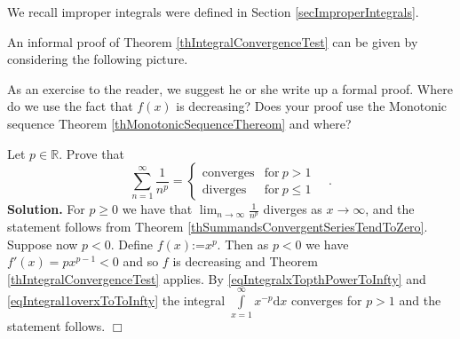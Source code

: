 \documentclass[12pt]{book}
\newcommand{\diff}{\text{d}}
\newcommand{\eqdef}{\textbf{:=}}
\newenvironment{solution}{\textbf{Solution.} }{$\Box$}
\newcommand{\optionalDisplay}[1]{}
\newcommand{\doublebrace}[4]{\left\{\begin{array}{ll} #1 & #2 \\#3 & #4  \end{array} \right.}
\begin{document}
We recall improper integrals were defined in Section \ref{secImproperIntegrals}.

An informal proof of Theorem \ref{thIntegralConvergenceTest} can be given by considering the following picture. 
\optionalDisplay{
\psset{xunit=0.6cm,yunit=0.6cm}

\begin{pspicture}(-1,-1)(9.5,6)

\rput(5.5,4){$\underbrace{ \int\limits_{1}^\infty f(x) \diff x}_{\mathrm{region~under~curve}} \geq\underbrace{ \sum\limits_{n=2}^{\infty} f(n)}_{\mathrm{blue~region}}$} 

\psaxes[labels=x, ticks=x]{<->}(0,0)(-1,-1)(9,6)

\pscustom[fillstyle=solid, linestyle=none,fillcolor=gray!30]{
\psplot{1}{9}{ 5 x  div}
\psline[linestyle=none](9, 0)(1,0)
}
\psplot[linewidth=1pt]{1}{9}{ 5 x  div}

\multido{\ra=1.0+1.0}{8}{%
\psframe[fillstyle=solid, fillcolor=cyan!40](\ra,0)(! \ra\space 1 add \space 5 \ra\space 1 add div )
}
\end{pspicture}
\begin{pspicture}(-1,-1)(9,6)
\psaxes[labels=x, ticks=x]{<->}(0,0)(-1,-1)(9,6)
\rput(5.5,4){$\underbrace{ \int\limits_{1}^\infty f(x) \diff x}_{\mathrm{region~under~curve}}\leq\underbrace{ \sum\limits_{n=1}^{\infty} f(n)}_{\mathrm{blue~region}}$} 

\multido{\ra=1.0+1.0}{8}{%
\psframe[fillstyle=solid, fillcolor=cyan!40](\ra,0)(! \ra\space 1 add \space 5 \ra\space div )
}
\psplot[linewidth=1pt]{1}{9}{ 5 x  div}
\end{pspicture}
} %

As an exercise to the reader, we suggest he or she write up a formal proof. Where do we use the fact that $f(x)$ is decreasing? Does your proof use the Monotonic sequence Theorem \ref{thMonotonicSequenceThereom} and where?

Let $p\in \mathbb R$. Prove that 
\begin{equation}\label{eqSumnToThePthConverges}
\sum\limits_{n=1}^{\infty} \frac{1}{n^p}= \doublebrace{\mathrm{converges}}{\mathrm{for~}p>1}{\mathrm{diverges}}{\mathrm{for~}p\leq 1}\quad .
\end{equation}
\begin{solution}
For $p\geq 0$ we have that $\lim_{n\to \infty} \frac{1}{n^p}$ diverges as $x\to \infty$, and the statement follows from Theorem \ref{thSummandsConvergentSeriesTendToZero}. Suppose now $p< 0$. Define $f(x)\eqdef x^{p}$. Then as $p<0$ we have $f'(x)= px^{p-1}<0$ and so $f$ is decreasing and Theorem \ref{thIntegralConvergenceTest} applies. By \eqref{eqIntegralxTopthPowerToInfty} and \eqref{eqIntegral1overxToToInfty}  the integral $\int\limits_{x=1}^{\infty} x^{-p}\diff x$ converges for $p>1$ and the statement follows.
\end{solution} 
\end{document}
